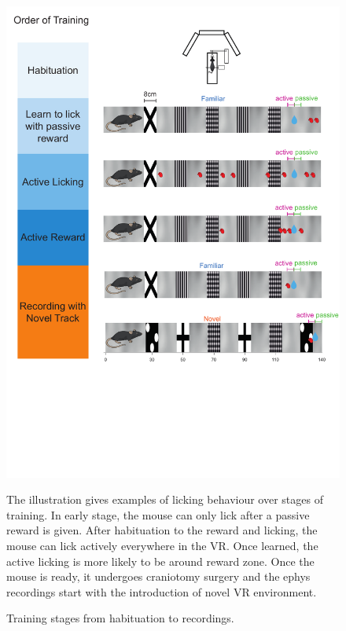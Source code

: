 \begin{figure}
    \centering
    \includegraphics[width=1\linewidth]{figures//Chapter 3 Behaviour//Thesis Figures//figure_PDFs/fig1_behaviour_training.pdf}
    \caption{Training stages from habituation to recordings. }
\medskip
\small
The illustration gives examples of licking behaviour over stages of training. In early stage, the mouse can only lick after a passive reward is given. After habituation to the reward and licking, the mouse can lick actively everywhere in the VR. Once learned, the active licking is more likely to be around reward zone. Once the mouse is ready, it undergoes craniotomy surgery and the ephys recordings start with the introduction of novel VR environment.
    \label{fig:overall training stages}
\end{figure}





